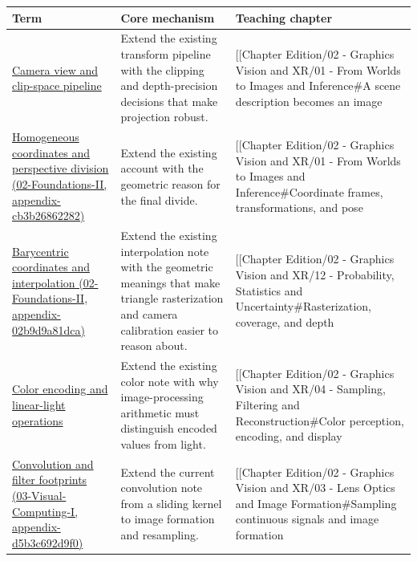 {\def\LTcaptype{none} %
\begin{longtable}[]{@{}
  >{\raggedright\arraybackslash}p{}
  >{\raggedright\arraybackslash}p{}
  >{\raggedright\arraybackslash}p{}@{}}
\toprule\noalign{}
\begin{minipage}[b]{\linewidth}\raggedright
Term
\end{minipage} & \begin{minipage}[b]{\linewidth}\raggedright
Core mechanism
\end{minipage} & \begin{minipage}[b]{\linewidth}\raggedright
Teaching chapter
\end{minipage} \\
\midrule\noalign{}
\endhead
\bottomrule\noalign{}
\endlastfoot
\hyperref[appendix-1c07d64f5e70]{Camera view and clip-space pipeline} & Extend the existing transform pipeline with the clipping and depth-precision decisions that make projection robust. & {[}{[}Chapter Edition/02 - Graphics Vision and XR/01 - From Worlds to Images and Inference\#A scene description becomes an image \\
\href{}{Homogeneous coordinates and perspective division (02-Foundations-II, appendix-cb3b26862282)} & Extend the existing account with the geometric reason for the final divide. & {[}{[}Chapter Edition/02 - Graphics Vision and XR/01 - From Worlds to Images and Inference\#Coordinate frames, transformations, and pose \\
\href{}{Barycentric coordinates and interpolation (02-Foundations-II, appendix-02b9d9a81dca)} & Extend the existing interpolation note with the geometric meanings that make triangle rasterization and camera calibration easier to reason about. & {[}{[}Chapter Edition/02 - Graphics Vision and XR/12 - Probability, Statistics and Uncertainty\#Rasterization, coverage, and depth \\
\hyperref[appendix-a9f83ad40792]{Color encoding and linear-light operations} & Extend the existing color note with why image-processing arithmetic must distinguish encoded values from light. & {[}{[}Chapter Edition/02 - Graphics Vision and XR/04 - Sampling, Filtering and Reconstruction\#Color perception, encoding, and display \\
\href{}{Convolution and filter footprints (03-Visual-Computing-I, appendix-d5b3c692d9f0)} & Extend the current convolution note from a sliding kernel to image formation and resampling. & {[}{[}Chapter Edition/02 - Graphics Vision and XR/03 - Lens Optics and Image Formation\#Sampling continuous signals and image formation \\

\end{longtable}}
